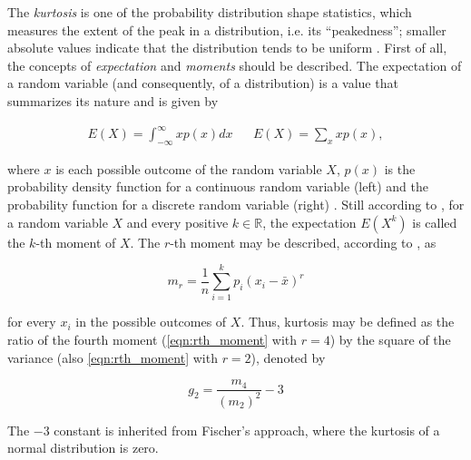 The \emph{kurtosis} is one of the probability distribution shape statistics, which measures the extent of the peak in a distribution, i.e. its ``peakedness''; smaller absolute values indicate that the distribution tends to be uniform \cite{zwillinger1999crc}. First of all, the concepts of \emph{expectation} and \emph{moments} should be described. The expectation of a random variable (and consequently, of a distribution) is a value that summarizes its nature and is given by

\begin{align}
\label{eqn:expectation}
E(X) = \int_{-\infty}^{\infty} x p(x)dx
&&
E(X) = \sum_{x} x p(x),
\end{align}

\noindent where $x$ is each possible outcome of the random variable $X$, $p(x)$ is the probability density function for a continuous random variable (left) and the probability function for a discrete random variable (right) \cite{degroot2012probability}. Still according to , for a random variable $X$ and every positive $k \in \mathbb{R}$, the expectation $E(X^{k})$ is
called the $k$-th moment of $X$. The $r$-th moment may be described, according to , as

\begin{equation}
\label{eqn:rth_moment}
m_{r} = \frac{1}{n}
        \sum_{i=1}^{k}p_{i}(x_{i} - \bar{x})^{r}
\end{equation}

\noindent for every $x_{i}$ in the possible outcomes of $X$. Thus, kurtosis may be defined as the ratio of the fourth moment (\autoref{eqn:rth_moment} with $r = 4$) by the square of the variance (also \autoref{eqn:rth_moment} with $r = 2$), denoted by

\begin{equation}
\label{eqn:kurtosis}
g_{2} = \frac{m_{4}}{(m_{2})^{2}} - 3
\end{equation}

The $-3$ constant is inherited from Fischer's approach, where the kurtosis of a normal distribution is zero.